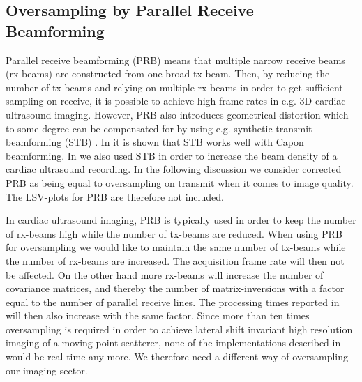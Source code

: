 \documentclass[journal]{IEEEtran}
\begin{document}
\subsection{Oversampling by Parallel Receive Beamforming}
Parallel receive beamforming (PRB) means that multiple narrow receive beams (rx-beams) are constructed from one broad tx-beam. Then, by reducing the number of tx-beams and relying on multiple rx-beams in order to get sufficient sampling on receive, it is possible to achieve high frame rates in e.g. 3D cardiac ultrasound imaging. However, PRB also introduces geometrical distortion which to some degree can be compensated for by using e.g. synthetic transmit beamforming (STB) \cite{Hergum2007, Denarie2011, Denarie2013}. In \cite{Rabinovich2013} it is shown that STB works well with Capon beamforming. In \cite{Asen} we also used STB in order to increase the beam density of a cardiac ultrasound recording. In the following discussion we consider corrected PRB as being equal to oversampling on transmit when it comes to image quality. The LSV-plots for PRB are therefore not included.

In cardiac ultrasound imaging, PRB is typically used in order to keep the number of rx-beams high while the number of tx-beams are reduced. When using PRB for oversampling we would like to maintain the same number of tx-beams while the number of rx-beams are increased. The acquisition frame rate will then not be affected. On the other hand more rx-beams will increase the number of covariance matrices, and thereby the number of matrix-inversions with a factor equal to the number of parallel receive lines. The processing times reported in \cite{Asen} will then also increase with the same factor. Since more than ten times oversampling is required in order to achieve lateral shift invariant high resolution imaging of a moving point scatterer, none of the implementations described in \cite{Asen} would be real time any more. We therefore need a different way of oversampling our imaging sector.
\end{document}
